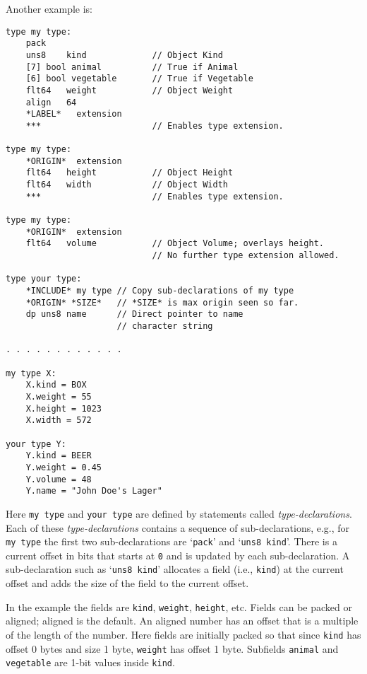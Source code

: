 \documentclass[12pt]{article}
\newenvironment{indpar}[1][0.3in]%
	{\begin{list}{}%
		     {\setlength{\itemsep}{0in}%
		      \setlength{\topsep}{0in}%
		      \setlength{\parsep}{1ex}%
		      \setlength{\labelwidth}{#1}%
		      \setlength{\leftmargin}{#1}%
		      \addtolength{\leftmargin}{\labelsep}}%
	 \item}%
	{\end{list}}
\begin{document}
Another example is:

\begin{indpar}\begin{verbatim}
type my type:
    pack
    uns8    kind             // Object Kind
    [7] bool animal          // True if Animal
    [6] bool vegetable       // True if Vegetable
    flt64   weight           // Object Weight
    align   64
    *LABEL*   extension
    ***                      // Enables type extension.

type my type:
    *ORIGIN*  extension
    flt64   height           // Object Height
    flt64   width            // Object Width
    ***                      // Enables type extension.

type my type:
    *ORIGIN*  extension
    flt64   volume           // Object Volume; overlays height.
                             // No further type extension allowed.

type your type:
    *INCLUDE* my type // Copy sub-declarations of my type
    *ORIGIN* *SIZE*   // *SIZE* is max origin seen so far.
    dp uns8 name      // Direct pointer to name
                      // character string

. . . . . . . . . . . .

my type X:
    X.kind = BOX
    X.weight = 55
    X.height = 1023
    X.width = 572

your type Y:
    Y.kind = BEER
    Y.weight = 0.45
    Y.volume = 48
    Y.name = "John Doe's Lager"
\end{verbatim}\end{indpar}

Here {\tt my type} and {\tt your type} are defined by
statements called {\em type-declarations}.  Each of these
{\em type-declarations} contains a sequence of sub-declarations, e.g.,
for {\tt my type} the first two sub-declarations are
`{\tt pack}' and `{\tt uns8 kind}'.  There is a current
offset in bits that starts at {\tt 0} and is updated by each sub-declaration.
A sub-declaration such as `{\tt uns8 kind}' allocates a field
(i.e., {\tt kind})
at the current offset and adds the size of the field to the
current offset.

In the example the fields are {\tt kind}, {\tt weight}, {\tt height}, etc.
Fields can be packed or aligned; aligned is the default.  An aligned number has an offset
that is a multiple of the length of the number.
Here fields are initially packed
so that since {\tt kind} has offset 0 bytes and size 1 byte,
{\tt weight} has offset 1 byte.  Subfields {\tt animal}
and {\tt vegetable} are 1-bit values inside {\tt kind}.
\end{document}
